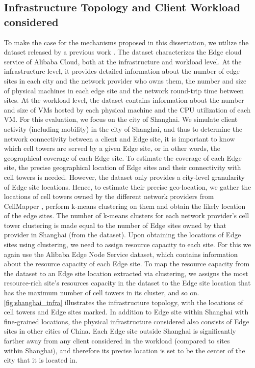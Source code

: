 \subsection{Infrastructure Topology and Client Workload considered}
\label{sec:nep_infra_topology}
\par To make the case for the mechanisms proposed in this dissertation, we utilize the dataset released by a previous work \cite{xu2021cloud}. The dataset characterizes the Edge cloud service of Alibaba Cloud, both at the infrastructure and workload level. At the infrastructure level, it provides detailed information about the number of edge sites in each city and the network provider who owns them, the number and size of physical machines in each edge site and the network round-trip time between sites. At the workload level, the dataset contains information about the number and size of VMs hosted by each physical machine and the CPU utilization of each VM. For this evaluation, we focus on the city of Shanghai. We simulate client activity (including mobility) in the city of Shanghai, and thus to determine the network connectivity between a client and Edge site, it is important to know which cell towers are served by a given Edge site, or in other words, the geographical coverage of each Edge site. To estimate the coverage of each Edge site, the precise geographical location of Edge sites and their connectivity with cell towers is needed. However, the dataset only provides a city-level granularity of Edge site locations. Hence, to estimate their precise geo-location, we gather the locations of cell towers owned by the different network providers from CellMapper \cite{cellmapper}, perform k-means clustering on them and obtain the likely location of the edge sites. The number of k-means clusters for each network provider's cell tower clustering is made equal to the number of Edge sites owned by that provider in Shanghai (from the dataset). Upon obtaining the locations of Edge sites using clustering, we need to assign resource capacity to each site. For this we again use the Alibaba Edge Node Service dataset, which contains information about the resource capacity of each Edge site. To map the resource capacity from the dataset to an Edge site location extracted via clustering, we assigns the most resource-rich site's resources capacity in the dataset to the Edge site location that has the maximum number of cell towers in its cluster, and so on. \cref{fig:shanghai_infra} illustrates the infrastructure topology, with the locations of cell towers and Edge sites marked. In addition to Edge site within Shanghai with fine-grained locations, the physical infrastructure considered also consists of Edge sites in other cities of China. Each Edge site outside Shanghai is significantly farther away from any client considered in the workload (compared to sites within Shanghai), and therefore its precise location is set to be the center of the city that it is located in.

